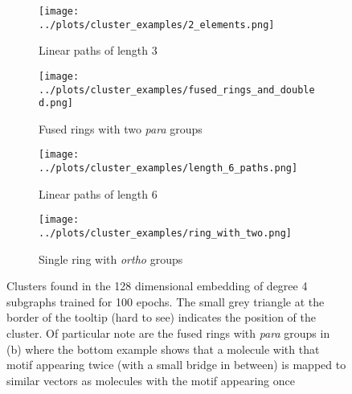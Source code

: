 \begin{figure}
\centering
\begin{subfigure}{0.45\textwidth}
    \texttt{[image: ../plots/cluster\_examples/2\_elements.png]}
    \caption{Linear paths of length 3}
\end{subfigure}
\begin{subfigure}{0.45\textwidth}
    \texttt{[image: ../plots/cluster\_examples/fused\_rings\_and\_doubled.png]}
    \caption{Fused rings with two \textit{para} groups}
\end{subfigure}
\begin{subfigure}{0.45\textwidth}
    \texttt{[image: ../plots/cluster\_examples/length\_6\_paths.png]}
    \caption{Linear paths of length 6}
\end{subfigure}
\begin{subfigure}{0.45\textwidth}
    \texttt{[image: ../plots/cluster\_examples/ring\_with\_two.png]}
    \caption{Single ring with \textit{ortho} groups}
\end{subfigure}
\caption{Clusters found in the 128 dimensional embedding of degree 4 subgraphs trained for 100 epochs. The small grey triangle at the border of the tooltip (hard to see) indicates the position of the cluster. Of particular note are the fused rings with \textit{para} groups in (b) where the bottom example shows that a molecule with that motif appearing twice (with a small bridge in between) is mapped to similar vectors as molecules with the motif appearing once}
\label{fig:clusters_100}
\end{figure}
